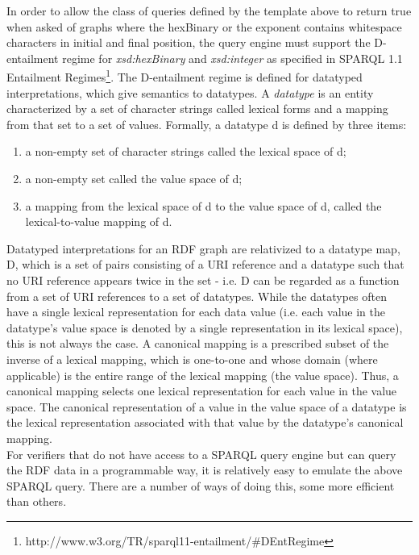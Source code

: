 In order to allow the class of queries defined by the template above to return true when asked of graphs where the hexBinary or the exponent contains whitespace characters in initial and final position, the query engine must support the D-entailment regime for \textit{xsd:hexBinary} and \textit{xsd:integer} as specified in SPARQL 1.1 Entailment Regimes\footnote{http://www.w3.org/TR/sparql11-entailment/\#DEntRegime}. The D-entailment regime is defined for datatyped interpretations, which give semantics to datatypes. A \textit{datatype} is an entity characterized by a set of character strings called lexical forms and a mapping from that set to a set of values. Formally, a datatype d is defined by three items:

\begin{enumerate}
\item a non-empty set of character strings called the lexical space of d;
\item a non-empty set called the value space of d;
\item a mapping from the lexical space of d to the value space of d, called the lexical-to-value mapping of d.
\end{enumerate}

Datatyped interpretations for an RDF graph are relativized to a datatype map, D, which is a set of pairs consisting of a URI reference and a datatype such that no URI reference appears twice in the set - i.e. D can be regarded as a function from a set of URI references to a set of datatypes. While the datatypes often have a single lexical representation for each data value (i.e. each value in the datatype's value space is denoted by a single representation in its lexical space), this is not always the case. A canonical mapping is a prescribed subset of the inverse of a lexical mapping, which is one-to-one and whose domain (where applicable) is the entire range of the lexical mapping (the value space). Thus, a canonical mapping selects one lexical representation for each value in the value space. The canonical representation of a value in the value space of a datatype is the lexical representation associated with that value by the datatype's canonical mapping.\\

For verifiers that do not have access to a SPARQL query engine but can query the RDF data in a programmable way, it is relatively easy to emulate the above SPARQL query. There are a number of ways of doing this, some more efficient than others.\\

